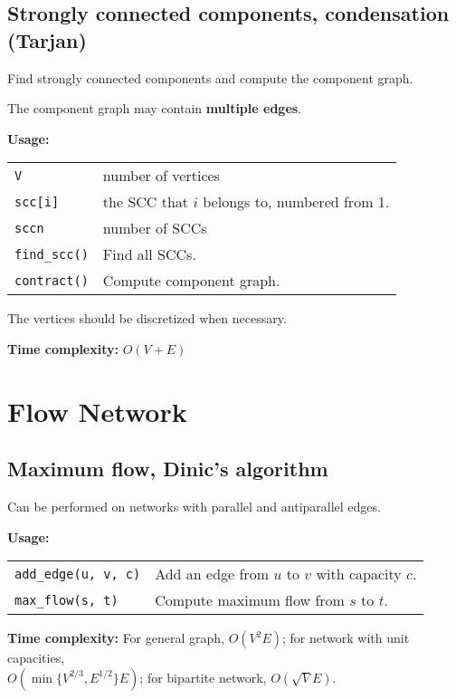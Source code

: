 \subsection{Strongly connected components, condensation (Tarjan)}
Find strongly connected components and compute the component graph. \par
\Warning The component graph may contain \textbf{multiple edges}. \par
\textbf{Usage:} \\[0.1cm]
\begin{tabular}{p{2.5cm} p{9cm}}
  \lstinline|V| & number of vertices \\
  \lstinline|scc[i]| & the SCC that $i$ belongs to, numbered from 1. \\
  \lstinline|sccn| & number of SCCs \\
  \lstinline|find_scc()| & Find all SCCs. \\
  \lstinline|contract()| & Compute component graph. \\
\end{tabular} \par
\Warning The vertices should be discretized when necessary. \par
\textbf{Time complexity:} $O(V + E)$ \par


\section{Flow Network}
\subsection{Maximum flow, Dinic's algorithm}
\Tick Can be performed on networks with parallel and antiparallel edges.\par
\textbf{Usage:} \\[0.1cm]
\begin{tabular}{p{3.5cm} p{8cm}}
  \lstinline|add_edge(u, v, c)| & Add an edge from $u$ to $v$ with capacity $c$. \\
  \lstinline|max_flow(s, t)| & Compute maximum flow from $s$ to $t$. \\
\end{tabular} \par
\textbf{Time complexity:} For general graph, $O(V^2E)$; for network with unit capacities, \\ $O(\min\{V^{2/3}, E^{1/2}\}E)$; for bipartite network, $O(\sqrt{V}E)$. \par



